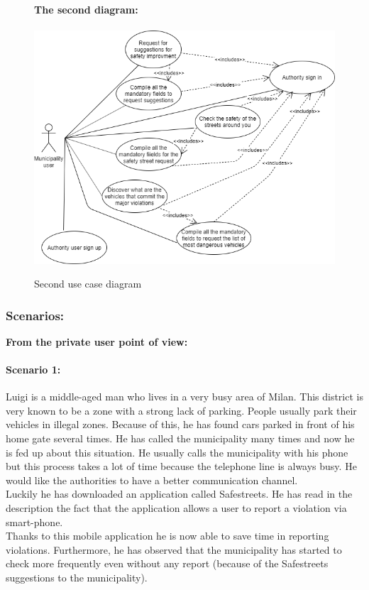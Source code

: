 \documentclass[titlepage]{article}
\begin{document}
\begin{figure}[h]
	\textbf{The second diagram:\\ \\ }
	\includegraphics[scale=0.65]{use case diagrams/use-case2.png}
	\centering
	\caption{Second use case diagram}
\end{figure}
\FloatBarrier

\subsubsection{Scenarios:}
\begin{center}
\textbf{From the private user point of view:}
\end{center}

\paragraph{Scenario 1:}Luigi is a middle-aged man who lives in a very busy area of Milan. This district is very known to be a zone with a strong lack of parking. People usually park their vehicles in illegal zones.
Because of this, he has found  cars parked in front of his home gate several times. He has called the municipality many times and now he is fed up about this situation. He usually calls the municipality with his phone but this process takes a lot of time because the telephone line is always busy. He would like the authorities to have a better communication channel.\\Luckily he has downloaded an application called Safestreets. He has read in the description the fact that the application allows a user to report a violation via smart-phone.\\
Thanks to this mobile application he is now able to save time in reporting violations. Furthermore, he has observed that  the municipality has started to check more frequently even without any report (because of the Safestreets suggestions to the municipality).
\end{document}
